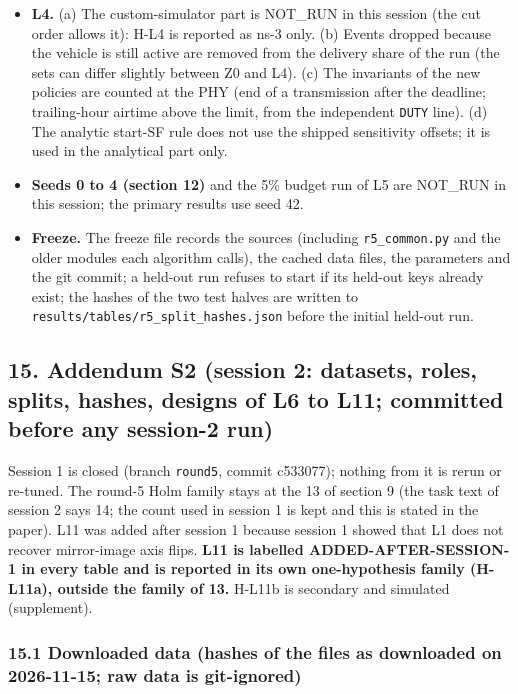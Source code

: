 \begin{itemize}
\item \textbf{L4.} (a) The custom-simulator part is NOT\_RUN in this session (the cut order allows it): H-L4 is reported as ns-3 only. (b) Events dropped because the vehicle is still active are removed from the delivery share of the run (the sets can differ slightly between Z0 and L4). (c) The invariants of the new policies are counted at the PHY (end of a transmission after the deadline; trailing-hour airtime above the limit, from the independent \texttt{DUTY} line). (d) The analytic start-SF rule does not use the shipped sensitivity offsets; it is used in the analytical part only.
\item \textbf{Seeds 0 to 4 (section 12)} and the 5\% budget run of L5 are NOT\_RUN in this session; the primary results use seed 42.
\item \textbf{Freeze.} The freeze file records the sources (including \texttt{r5\_common.py} and the older modules each algorithm calls), the cached data files, the parameters and the git commit; a held-out run refuses to start if its held-out keys already exist; the hashes of the two test halves are written to \texttt{results/tables/r5\_split\_hashes.json} before the initial held-out run.
\end{itemize}


\subsection*{15. Addendum S2 (session 2: datasets, roles, splits, hashes, designs of L6 to L11; committed before any session-2 run)}

Session 1 is closed (branch \texttt{round5}, commit c533077); nothing from it is rerun or re-tuned. The round-5 Holm family stays at the 13 of section 9 (the task text of session 2 says 14; the count used in session 1 is kept and this is stated in the paper). L11 was added after session 1 because session 1 showed that L1 does not recover mirror-image axis flips. \textbf{L11 is labelled ADDED-AFTER-SESSION-1 in every table and is reported in its own one-hypothesis family (H-L11a), outside the family of 13.} H-L11b is secondary and simulated (supplement).

\subsubsection*{15.1 Downloaded data (hashes of the files as downloaded on 2026-11-15; raw data is git-ignored)}


